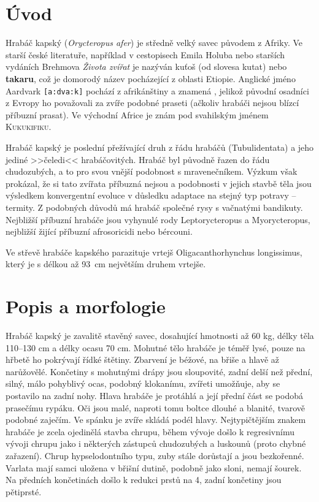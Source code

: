 \documentclass[a4paper, 12pt]{article}
\begin{document}
\tableofcontents

\section{Úvod}
Hrabáč kapský (\emph{Orycteropus afer}) je středně velký savec původem z Afriky. Ve starší české literatuře, 
například v cestopisech Emila Holuba nebo starších vydáních Brehmova \textit{Života zvířat} je nazýván kuťoš (od slovesa kutat) 
nebo \textbf{takaru}, což je domorodý název pocházející z oblasti Etiopie.
Anglické jméno Aardvark \texttt{[a:dva:k]} pochází z afrikánštiny a znamená , 
jelikož původní osadníci z Evropy ho považovali za zvíře podobné praseti 
(ačkoliv hrabáči nejsou blízcí příbuzní prasat). 
Ve východní Africe je znám pod svahilským jménem \textsc{Kukukifiku}.

\textsf{Hrabáč kapský} je poslední přežívající druh z řádu hrabáčů (Tubulidentata) a jeho jediné >>čeledi<< hrabáčovitých. 
Hrabáč byl původně řazen do řádu chudozubých, a to pro svou vnější podobnost s mravenečníkem. 
Výzkum však prokázal, že si tato zvířata příbuzná nejsou a podobnosti v jejich stavbě 
těla jsou výsledkem konvergentní evoluce v důsledku adaptace na stejný typ potravy -- termity. 
Z podobných důvodů má hrabáč společné rysy s vačnatými bandikuty. Nejbližší příbuzní hrabáče 
jsou vyhynulé rody Leptorycteropus a Myorycteropus, nejbližší žijící příbuzní afrosoricidi nebo bércouni.

Ve střevě hrabáče kapského parazituje vrtejš Oligacanthorhynchus longissimus, 
který je s délkou až 93~cm největším druhem vrtejše.

\section{Popis a morfologie}

Hrabáč kapský je zavalitě stavěný savec, dosahující hmotnosti až 60 kg, délky těla 110--130 cm a délky ocasu 70 cm. 
Mohutné tělo hrabáče je téměř lysé, pouze na hřbetě ho pokrývají řídké štětiny. 
Zbarvení je béžové, na břiše a hlavě až narůžovělé. 
Končetiny s mohutnými drápy jsou sloupovité, zadní delší než přední, silný, málo pohyblivý ocas, podobný klokanímu, zvířeti umožňuje, aby se postavilo na zadní nohy. 
Hlava hrabáče je protáhlá a její přední část se podobá prasečímu rypáku. Oči jsou malé, naproti tomu boltce dlouhé a blanité, tvarově podobné zaječím. Ve spánku je zvíře skládá podél hlavy.
Nejtypičtějším znakem hrabáče je zcela ojedinělá stavba chrupu, během vývoje došlo k regresivnímu vývoji chrupu jako i některých zástupců chudozubých a luskounů (proto chybné zařazení). 
Chrup hypselodontního typu, zuby stále dorůstají a jsou bezkořenné.
Varlata mají samci uložena v břišní dutině, podobně jako sloni, nemají šourek.
Na předních končetinách došlo k redukci prstů na 4, zadní končetiny jsou pětiprsté.
\end{document}
